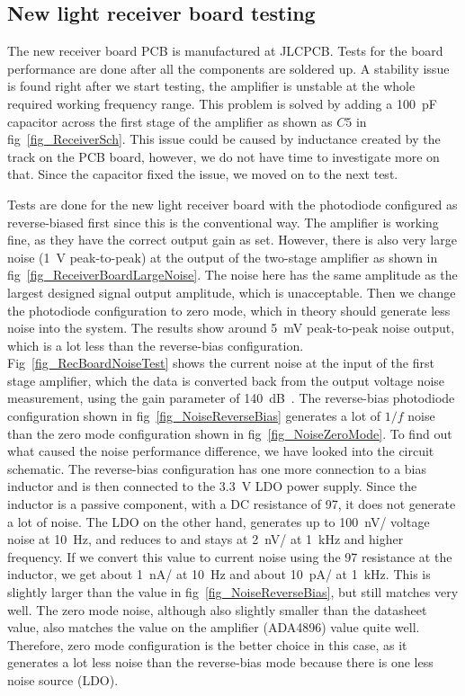 \subsection{New light receiver board testing}

The new receiver board PCB is manufactured at JLCPCB.  Tests for the board performance are done after all the components are soldered up.  A stability issue is found right after we start testing, the amplifier is unstable at the whole required working frequency range.   This problem is solved by adding a \qty{100}{pF} capacitor across the first stage of the amplifier as shown as $C5$ in fig~\ref{fig_ReceiverSch}.  This issue could be caused by inductance created by the track on the PCB board, however, we do not have time to investigate more on that.  Since the capacitor fixed the issue, we moved on to the next test.

Tests are done for the new light receiver board with the photodiode configured as reverse-biased first since this is the conventional way.  The amplifier is working fine, as they have the correct output gain as set.  However, there is also very large noise (\qty{1}{V} peak-to-peak) at the output of the two-stage amplifier as shown in fig~\ref{fig_ReceiverBoardLargeNoise}.  The noise here has the same amplitude as the largest designed signal output amplitude, which is unacceptable.  Then we change the photodiode configuration to zero mode, which in theory should generate less noise into the system.  The results show around \qty{5}{mV} peak-to-peak noise output, which is a lot less than the reverse-bias configuration.  Fig~\ref{fig_RecBoardNoiseTest} shows the current noise at the input of the first stage amplifier, which the data is converted back from the output voltage noise measurement, using the gain parameter of \qty{140}{dB\Omega}.  The reverse-bias photodiode configuration shown in fig~\ref{fig_NoiseReverseBias} generates a lot of $1/f$ noise than the zero mode configuration shown in fig~\ref{fig_NoiseZeroMode}.  To find out what caused the noise performance difference, we have looked into the circuit schematic.  The reverse-bias configuration has one more connection to a bias inductor and is then connected to the \qty{3.3}{V} LDO power supply.  Since the inductor is a passive component, with a DC resistance of \qty{97}{\Omega}, it does not generate a lot of noise.  The LDO on the other hand, generates up to \qty{100}{nV/\sqrthz} voltage noise at \qty{10}{Hz}, and reduces to and stays at \qty{2}{nV/\sqrthz} at \qty{1}{kHz} and higher frequency.  If we convert this value to current noise using the \qty{97}{\Omega} resistance at the inductor, we get about \qty{1}{nA/\sqrthz} at \qty{10}{Hz} and about \qty{10}{pA/\sqrthz} at \qty{1}{kHz}.  This is slightly larger than the value in fig~\ref{fig_NoiseReverseBias}, but still matches very well.  The zero mode noise, although also slightly smaller than the datasheet value, also matches the value on the amplifier (ADA4896) value quite well.  Therefore, zero mode configuration is the better choice in this case, as it generates a lot less noise than the reverse-bias mode because there is one less noise source (LDO).

